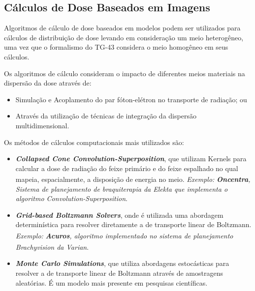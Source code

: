 \documentclass[11pt,a4paper]{article}
\begin{document}
		\subsection{Cálculos de Dose Baseados em Imagens}

			Algoritmos de cálculo de dose baseados em modelos podem ser utilizados para cálculos de distribuição de dose levando em consideração um meio heterogêneo, uma vez que o formalismo do TG-43 considera o meio homogêneo em seus cálculos.
			
			Os algoritmos de cálculo consideram o impacto de diferentes meios materiais na dispersão da dose através de:

				\begin{itemize}
					\item Simulação e Acoplamento do par fóton-elétron no transporte de radiação; ou
					\item Através da utilização de técnicas de integração da dispersão multidimensional.
				\end{itemize}
			
			Os métodos de cálculos computacionais mais utilizados são:

				\begin{itemize}
					\item \textbf{\textit{\textcolor{CarnationPink}{Collapsed Cone Convolution-Superposition}}}, que utilizam Kernels para calcular a dose de radiação do feixe primário e do feixe espalhado no qual mapeia, espacialmente, a disposição de energia no meio. \textit{Exemplo:} \textit{\textbf{Oncentra\textsuperscript{\textregistered}}, Sistema de planejamento de braquiterapia da Elekta que implementa o algoritmo Convolution-Superposition}.
					
					\item \textbf{\textit{\textcolor{CarnationPink}{Grid-based Boltzmann Solvers}}}, onde é utilizada uma abordagem determinística para resolver diretamente a   de transporte linear de Boltzmann. \textit{Exemplo:} \textit{\textbf{Acuros\textsuperscript{\textregistered}}, algoritmo implementado no sistema de planejamento Brachyvision\textsuperscript{\textregistered} da Varian}.
					
					\item \textbf{\textit{\textcolor{CarnationPink}{Monte Carlo Simulations}}}, que utiliza abordagens estocásticas para resolver a   de transporte linear de Boltzmann através de amostragens aleatórias. É um modelo mais presente em pesquisas científicas.
					
					\end{itemize}
		
\end{document}
